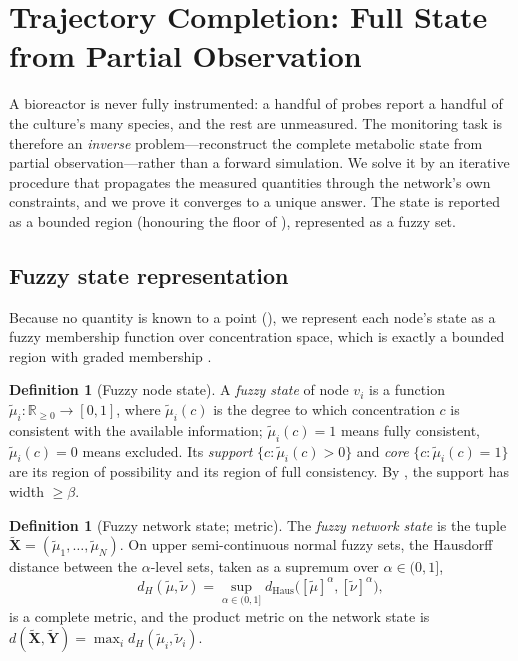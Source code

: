 \documentclass[11pt,twocolumn,a4paper]{article}
\theoremstyle{thmstyle}
\theoremstyle{definition}
\newtheorem{definition}[theorem]{Definition}
\theoremstyle{remark}
\newcommand{\R}{\mathbb{R}}
\newcommand{\floorc}{\beta}
\begin{document}
\section{Trajectory Completion: Full State from Partial Observation}
\label{sec:completion}

A bioreactor is never fully instrumented: a handful of probes report a
handful of the culture's many species, and the rest are unmeasured. The
monitoring task is therefore an \emph{inverse} problem---reconstruct the
complete metabolic state from partial observation---rather than a forward
simulation. We solve it by an iterative procedure that propagates the
measured quantities through the network's own constraints, and we prove it
converges to a unique answer. The state is reported as a bounded region
(honouring the floor of ), represented as a fuzzy set.

\subsection{Fuzzy state representation}

Because no quantity is known to a point (), we represent
each node's state as a fuzzy membership function over concentration space,
which is exactly a bounded region with graded membership
\citep{zadeh1965fuzzy}.

\begin{definition}[Fuzzy node state]
\label{def:fuzzy}
A \emph{fuzzy state} of node $v_i$ is a function
$\tilde\mu_i\colon\R_{\ge0}\to[0,1]$, where $\tilde\mu_i(c)$ is the degree
to which concentration $c$ is consistent with the available information;
$\tilde\mu_i(c)=1$ means fully consistent, $\tilde\mu_i(c)=0$ means
excluded. Its \emph{support} $\{c:\tilde\mu_i(c)>0\}$ and \emph{core}
$\{c:\tilde\mu_i(c)=1\}$ are its region of possibility and its region of
full consistency. By , the support has width
$\ge\floorc$.
\end{definition}

\begin{definition}[Fuzzy network state; metric]
\label{def:fuzzy-net}
The \emph{fuzzy network state} is the tuple
$\widetilde{\mathbf{X}}=(\tilde\mu_1,\dots,\tilde\mu_N)$. On upper
semi-continuous normal fuzzy sets, the Hausdorff distance between the
$\alpha$-level sets, taken as a supremum over $\alpha\in(0,1]$,
\[
d_H(\tilde\mu,\tilde\nu)=\sup_{\alpha\in(0,1]}
d_{\mathrm{Haus}}\!\bigl([\tilde\mu]^\alpha,[\tilde\nu]^\alpha\bigr),
\]
is a complete metric, and the product metric on the network state is
$d(\widetilde{\mathbf{X}},\widetilde{\mathbf{Y}})=\max_i
d_H(\tilde\mu_i,\tilde\nu_i)$.
\end{definition}
\end{document}
